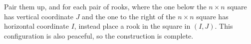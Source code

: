 Pair them up, and for each pair of rooks, where the one below the $n\times n$ square has vertical coordinate $J$ and the one to the right of the $n\times n$ square has horizontal coordinate $I$, instead place a rook in the square in $(I,J)$. This configuration is also peaceful, so the construction is complete.

